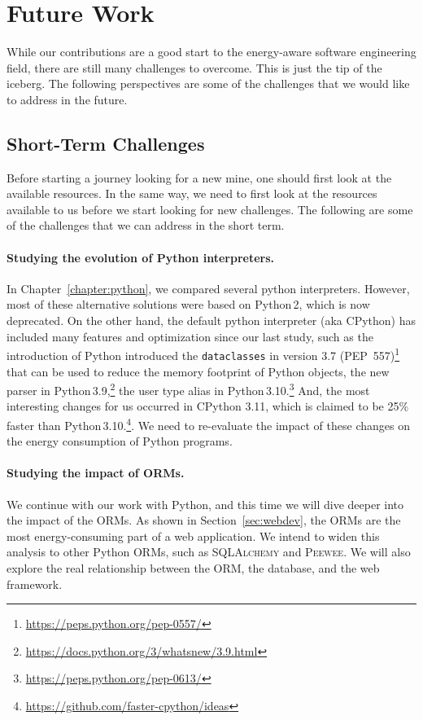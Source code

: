 \section{Future Work}
While our contributions are a good start to the energy-aware software engineering field, there are still many challenges to overcome.
This is just the tip of the iceberg.
The following perspectives are some of the challenges that we would like to address in the future.

\subsection{Short-Term Challenges}
Before starting a journey looking for a new mine, one should first look at the available resources.
In the same way, we need to first look at the resources available to us before we start looking for new challenges.
The following are some of the challenges that we can address in the short term.

\paragraph{Studying the evolution of Python interpreters.}
In Chapter~\ref{chapter:python}, we compared several python interpreters.
However, most of these alternative solutions were based on Python\,2, which is now deprecated. 
On the other hand, the default python interpreter (aka CPython) has included many features and optimization since our last study, such as the introduction of Python introduced the \texttt{dataclasses} in version 3.7 (PEP~557)\footnote{\url{https://peps.python.org/pep-0557/}} that can be used to reduce the memory footprint of Python objects, the new parser in Python\,3.9,\footnote{\url{https://docs.python.org/3/whatsnew/3.9.html}} the user type alias in Python\,3.10.\footnote{\url{https://peps.python.org/pep-0613/}}
And, the most interesting changes for us occurred in CPython 3.11, which is claimed to be 25\% faster than Python\,3.10.\footnote{\url{https://github.com/faster-cpython/ideas}}.
We need to re-evaluate the impact of these changes on the energy consumption of Python programs.

\paragraph{Studying the impact of ORMs.}
We continue with our work with Python, and this time we will dive deeper into the impact of the ORMs.
As shown in Section~\ref{sec:webdev}, the ORMs are the most energy-consuming part of a web application.
We intend to widen this analysis to other Python ORMs, such as \textsc{SQLAlchemy} and \textsc{Peewee}.
We will also explore the real relationship between the ORM, the database, and the web framework.

